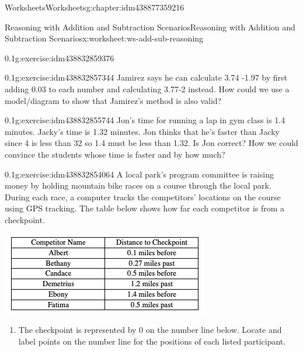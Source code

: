 \documentclass[twoside,11pt,]{book}
\begin{document}
\begin{chapterptx}{Worksheets}{}{Worksheets}{}{}{g:chapter:idm438877359216}
\begin{worksheet-section-numberless}{Reasoning with Addition and Subtraction Scenarios}{}{Reasoning with Addition and Subtraction Scenarios}{}{}{x:worksheet:ws-add-sub-reasoning}
\begin{divisionexercise}{2}{}{0.1}{g:exercise:idm438832859376}
\end{divisionexercise}%
\begin{divisionexercise}{3}{}{0.1}{g:exercise:idm438832857344}%
Jamirez says he can calculate \textdollar{}3.74 -\textdollar{}1.97 by first adding \textdollar{}0.03 to each number and calculating \textdollar{}3.77-\textdollar{}2 instead.  How could we use a model\slash{}diagram to show that Jamirez’s method is also valid?%
\end{divisionexercise}%
\begin{divisionexercise}{4}{}{0.1}{g:exercise:idm438832855744}%
Jon’s time for running a lap in gym class is 1.4 minutes.  Jacky’s time is 1.32 minutes.  Jon thinks that he’s faster than Jacky since 4 is less than 32 so 1.4 must be less than 1.32.  Is Jon correct?  How we could convince the students whose time is faster and by how much?%
\end{divisionexercise}%
\begin{divisionexercise}{5}{}{0.1}{g:exercise:idm438832854064}%
A local park’s program committee is raising money by holding mountain bike races on a course through the local park.  During each race, a computer tracks the competitors’ locations on the course using GPS tracking.  The table below shows how far each competitor is from a checkpoint.%
\begin{sidebyside}{1}{0.05}{0.05}{0}%
\begin{sbspanel}{0.9}%
\includegraphics[width=1\linewidth]{images/reasoning-table-checkpoint.png}
\end{sbspanel}%
\end{sidebyside}%
\leavevmode%
\begin{enumerate}[label=(\alph*)]
\item{}The checkpoint is represented by 0 on the number line below.  Locate and label points on the number line for the positions of each listed participant. \leavevmode%
\begin{sidebyside}{1}{0.05}{0.05}{0}%
\begin{sbspanel}{0.9}%

\end{sbspanel}
\end{sidebyside}
\end{enumerate}
\end{divisionexercise}
\end{worksheet-section-numberless}
\end{chapterptx}
\end{document}
